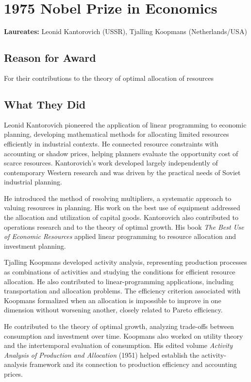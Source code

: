 \chapter{1975 Nobel Prize in Economics}
\textbf{Laureates: }Leonid Kantorovich (USSR), Tjalling Koopmans (Netherlands/USA)

\section*{Reason for Award}
For their contributions to the theory of optimal allocation of resources

\section{What They Did}
Leonid Kantorovich pioneered the application of linear programming to economic planning,
developing mathematical methods for allocating limited resources efficiently in industrial
contexts. He connected resource constraints with accounting or shadow prices, helping planners
evaluate the opportunity cost of scarce resources. Kantorovich's work developed largely
independently of contemporary Western research and was driven by the practical needs of Soviet
industrial planning.

He introduced the method of resolving multipliers, a systematic approach to valuing resources in
planning. His work on the best use of equipment addressed the allocation and utilization of capital
goods. Kantorovich also contributed to operations research and to the theory of optimal growth. His
book \textit{The Best Use of Economic Resources} applied linear programming to resource allocation
and investment planning.

Tjalling Koopmans developed activity analysis, representing production processes as combinations
of activities and studying the conditions for efficient resource allocation. He also contributed
to linear-programming applications, including transportation and allocation problems. The
efficiency criterion associated with Koopmans formalized when an allocation is impossible to
improve in one dimension without worsening another, closely related to Pareto efficiency.

He contributed to the theory of optimal growth, analyzing trade-offs between consumption and
investment over time. Koopmans also worked on utility theory and the intertemporal evaluation of
consumption. His edited volume \textit{Activity Analysis of Production and Allocation} (1951)
helped establish the activity-analysis framework and its connection to production efficiency and
accounting prices.

